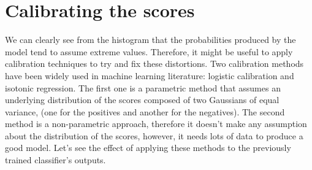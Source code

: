 \documentclass[oneside]{article}\usepackage[]{graphicx}\usepackage[]{color}
\begin{document}
\clearpage

\section*{Calibrating the scores}
We can clearly see from the histogram that the probabilities produced by the model tend to assume extreme values. Therefore, it might be useful to apply calibration techniques to try and fix these distortions. Two calibration methods have been widely used in machine learning literature: logistic calibration and isotonic regression. The first one is a parametric method that assumes an underlying distribution of the scores composed of two Gaussians of equal variance, (one for the positives and another for the negatives). The second method is a non-parametric approach, therefore it doesn't make any assumption about the distribution of the scores, however, it needs lots of data to produce a good model. Let's see the effect of applying these methods to the previously trained classifier's outputs.
\end{document}

